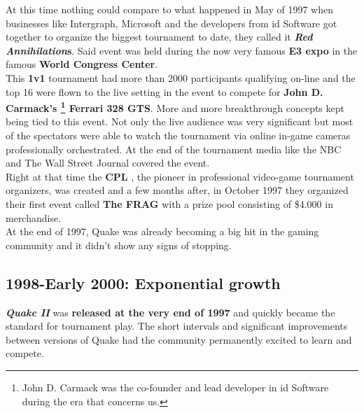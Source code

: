 At this time nothing could compare to what happened in May of 1997 when businesses like Intergraph, Microsoft and the developers from id Software got together to organize the biggest tournament to date, they called it \textbf{\textit{Red Annihilation}s}. Said event was held during the now very famous \textbf{E3 expo} \citep{e3} in the famous \textbf{World Congress Center}.\\

This \textbf{1v1} tournament had more than 2000 participants qualifying on-line and the top 16 were flown to the live setting in the event to compete for \textbf{John D. Carmack's \footnote{John D. Carmack was the co-founder and lead developer in id Software during the era that concerns us.} Ferrari 328 GTS}. More and more breakthrough concepts kept being tied to this event. Not only the live audience was very significant but most of the spectators were able to watch the tournament via online in-game cameras professionally orchestrated. At the end of the tournament media like the NBC and The Wall Street Journal covered the event.\\

Right at that time the \textbf{CPL} \citep{web:cpl}, the pioneer in professional video-game tournament organizers, was created and a few months after, in October 1997 they organized their first event called \textbf{The FRAG} with a prize pool consisting of \$4.000 in merchandise.\\

At the end of 1997, Quake was already becoming a big hit in the gaming community and it didn't show any signs of stopping.\\

\subsection{1998-Early 2000: Exponential growth}


\textbf{\textit{Quake II}} \citep{game:quake2} was \textbf{released at the very end of 1997} and quickly became the standard for tournament play. The short intervals and significant improvements between versions of Quake had the community permanently excited to learn and compete.\\

